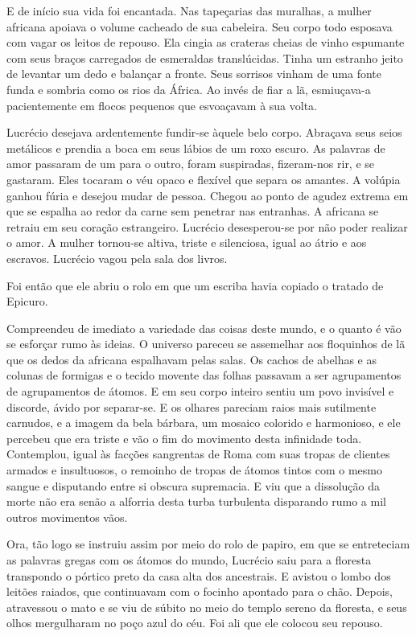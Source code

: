 E de início sua vida foi encantada. Nas tapeçarias das muralhas, a mulher
africana apoiava o volume cacheado de sua cabeleira. Seu corpo todo
esposava com vagar os leitos de repouso. Ela cingia as crateras cheias de
vinho espumante com seus braços carregados de esmeraldas translúcidas.
Tinha um estranho jeito de levantar um dedo e balançar a fronte. Seus
sorrisos vinham de uma fonte funda e sombria como os rios da África. Ao
invés de fiar a lã, esmiuçava-a pacientemente em flocos pequenos que
esvoaçavam à sua volta.

Lucrécio desejava ardentemente fundir-se àquele belo corpo. Abraçava seus
seios metálicos e prendia a boca em seus lábios de um roxo escuro. As
palavras de amor passaram de um para o outro, foram suspiradas,
fizeram-nos rir, e se gastaram. Eles tocaram o véu opaco e flexível que
separa os amantes. A volúpia ganhou fúria e desejou mudar de pessoa.
Chegou ao ponto de agudez extrema em que se espalha ao redor da carne sem
penetrar nas entranhas. A africana se retraiu em seu coração estrangeiro.
Lucrécio desesperou-se por não poder realizar o amor. A mulher tornou-se
altiva, triste e silenciosa, igual ao átrio e aos escravos. Lucrécio vagou
pela sala dos livros.

Foi então que ele abriu o rolo em que um escriba havia copiado o tratado de
Epicuro.

Compreendeu de imediato a variedade das coisas deste mundo, e o quanto é
vão se esforçar rumo às ideias. O universo pareceu se assemelhar aos
floquinhos de lã que os dedos da africana espalhavam pelas salas. Os
cachos de abelhas e as colunas de formigas e o tecido movente das folhas
passavam a ser agrupamentos de agrupamentos de átomos. E em seu corpo
inteiro sentiu um povo invisível e discorde, ávido por separar-se. E os
olhares pareciam raios mais sutilmente carnudos, e a imagem da bela
bárbara, um mosaico colorido e harmonioso, e ele percebeu que era triste e
vão o fim do movimento desta infinidade toda. Contemplou, igual às facções
sangrentas de Roma com suas tropas de clientes armados e insultuosos, o
remoinho de tropas de átomos tintos com o mesmo sangue e disputando entre
si obscura supremacia. E viu que a dissolução da morte não era senão a
alforria desta turba turbulenta disparando rumo a mil outros movimentos
vãos.

Ora, tão logo se instruiu assim por meio do rolo de papiro, em que se
entreteciam as palavras gregas com os átomos do mundo, Lucrécio saiu para
a floresta transpondo o pórtico preto da casa alta dos ancestrais. E
avistou o lombo dos leitões raiados, que continuavam com o focinho
apontado para o chão. Depois, atravessou o mato e se viu de súbito no meio
do templo sereno da floresta, e seus olhos mergulharam no poço azul do
céu. Foi ali que ele colocou seu repouso.

